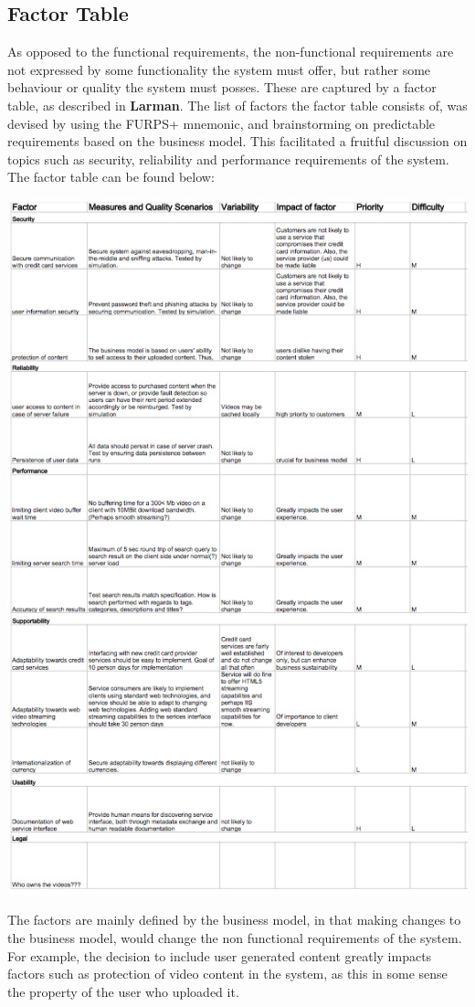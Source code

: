 \subsection{Factor Table}
As opposed to the functional requirements, the non-functional requirements are not expressed by some functionality the system must offer, but rather some behaviour or quality the system must posses. These are captured by a factor table, as described in \textbf{Larman}. The list of factors the factor table consists of, was devised by using the FURPS+ mnemonic, and brainstorming on predictable requirements based on the business model. This facilitated a fruitful discussion on topics such as security, reliability and performance requirements of the system. The factor table can be found below:
\begin{center}
\includegraphics[scale=1.3]{FactorTable.png}
\end{center}
The factors are mainly defined by the business model, in that making changes to the business model, would change the non functional requirements of the system.  For example, the decision to include user generated content greatly impacts factors such as protection of video content in the system, as this in some sense the property of the user who uploaded it.

